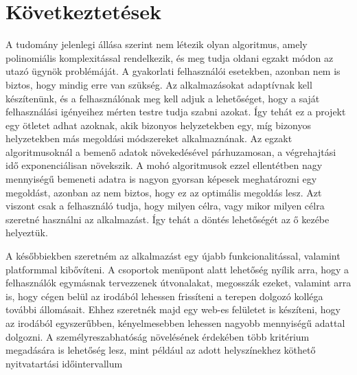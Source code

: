 \chapter{Következtetések}\label{ch:ALAP}

A tudomány jelenlegi állása szerint nem létezik olyan algoritmus, amely polinomiális komplexitással rendelkezik, és meg tudja oldani egzakt módon az utazó ügynök problémáját. A gyakorlati felhasználói esetekben, azonban nem is biztos, hogy mindig erre van szükség. Az alkalmazásokat adaptívnak kell készítenünk, és a felhasználónak meg kell adjuk a lehetőséget, hogy a saját felhasználási igényeihez mérten testre tudja szabni azokat. Így tehát ez a projekt egy ötletet adhat azoknak, akik bizonyos helyzetekben egy, míg bizonyos helyzetekben más megoldási módszereket alkalmaznának. Az egzakt algoritmusoknál a bemenő adatok növekedésével párhuzamosan, a végrehajtási idő exponenciálisan növekszik. A mohó algoritmusok ezzel ellentétben nagy mennyiségű bemeneti adatra is nagyon gyorsan képesek meghatározni egy megoldást, azonban az nem biztos, hogy ez az optimális megoldás lesz. Azt viszont csak a felhasználó tudja, hogy milyen célra, vagy mikor milyen célra szeretné használni az alkalmazást. Így tehát a döntés lehetőségét az ő kezébe helyeztük.

A későbbiekben szeretném az alkalmazást egy újabb funkcionalitással, valamint platformmal kibővíteni. A csoportok menüpont alatt lehetőség nyílik arra, hogy a felhasználók egymásnak tervezzenek útvonalakat, megosszák ezeket, valamint arra is, hogy cégen belül az irodából lehessen frissíteni a terepen dolgozó kolléga további állomásait. Ehhez szeretnék majd egy web-es felületet is készíteni, hogy az irodából egyszerűbben, kényelmesebben lehessen nagyobb mennyiségű adattal dolgozni. A személyreszabhatóság növelésének érdekében több kritérium megadására is lehetőség lesz, mint például az adott helyszínekhez köthető nyitvatartási időintervallum\cite{gt_problem}\cite{gt_and_appl}\cite{gt_alg_india}\cite{comp_tsp}
